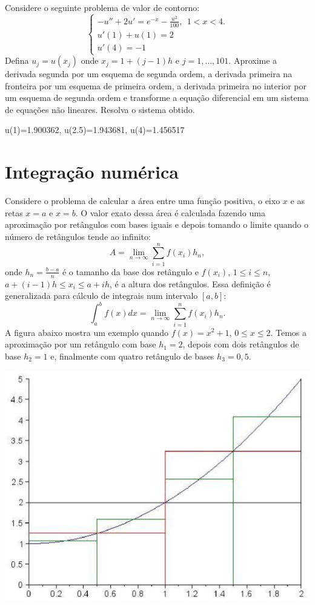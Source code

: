 \begin{Exercise} Considere o seguinte problema de valor de contorno:
$$\left\{\begin{array}{l}-u''+2u'=e^{-x}- \frac{u^2}{100},~~ 1<x<4.\\
u'(1)+u(1)=2\\
u'(4)=-1\end{array}
\right.
$$
Defina $u_j=u(x_j)$ onde $x_j=1+{(j-1)}{h}$ e $j=1,\ldots,101$. Aproxime a derivada segunda por um esquema de segunda ordem, a derivada primeira na fronteira por um esquema de primeira ordem, a derivada primeira no interior por um esquema de segunda ordem e transforme a equação diferencial em um sistema de equações não lineares. Resolva o sistema  obtido.
\end{Exercise}
\begin{Answer}
  \begin{tiny}
u(1)=1.900362, u(2.5)=1.943681, u(4)=1.456517    
  \end{tiny}
\end{Answer}

\section{Integração numérica}

Considere o problema de calcular a área entre uma função positiva, o eixo $x$ e as retas $x=a$ e $x=b$. O valor exato dessa área é calculada fazendo uma aproximação por retângulos com bases iguais e depois tomando o limite quando o número de retângulos tende ao infinito:
$$
A=\lim_{n\to\infty}\sum_{i=1}^nf(x_i)h_n,
$$
onde $h_n=\frac{b-a}{n}$ é o tamanho da base dos retângulo e $f(x_i)$, $1\leq i\leq n$, $a+(i-1)h\leq x_i\leq a+ih$, é a altura dos retângulos. Essa definição é generalizada para cálculo de integrais num intervalo $[a,b]$:
$$
\int_a^bf(x)dx=\lim_{n\to\infty}\sum_{i=1}^nf(x_i)h_n.
$$
A figura abaixo mostra um exemplo quando $f(x)=x^2+1$, $0\leq x\leq 2$. Temos a aproximação por um retângulo com base $h_1=2$, depois com dois retângulos de base $h_2=1$ e, finalmente com quatro retângulo de bases $h_3=0,5$.
\begin{center}
\includegraphics[scale=0.7]{./cap_derint/pics/int_1.eps}
\end{center}

